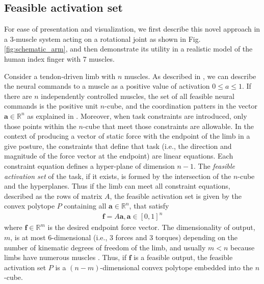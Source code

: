 \label{s:methods}
\subsection*{Feasible activation set}
For ease of presentation and visualization, we first describe this novel approach in a 3-muscle system acting on a  rotational joint as shown in Fig. \ref{fig:schematic_arm}, and then demonstrate its utility in a realistic model of the human index finger with 7 muscles. 

Consider a tendon-driven limb with $n$ muscles.
As described in \cite{Kuo1993Human, Chao1978Graphical,spoor1983balancing,Valero-Cuevas2009mathematical, valero-cuevas2015neuromechanics}, we can describe the neural commands to a muscle as a positive value of activation $0 \leq a \leq 1$.
If there are $n$ independently controlled  muscles,  the set of all feasible neural commands  is the positive unit $n$-cube, and the coordination patters in the vector $\textbf{a} \in \mathbb{R}^n$ as explained in \cite{Valero-Cuevas2009mathematical, valero-cuevas2015fundamentals}.
Moreover, when  task constraints are introduced, only those points within the $n$-cube that meet those constraints are allowable.
In the context of producing a vector of static force with the endpoint of the limb in a give posture, the constraints that define that task (i.e., the direction and magnitude of the force vector at the endpoint) are linear equations.  Each constraint equation defines a hyper-plane of dimension $n-1$.
The \emph{feasible activation set} of the task, if it exists,  is formed by the intersection of the $n$-cube and the hyperplanes.
Thus if the limb can meet all constraint equations, described as the rows of matrix $A$, the feasible activation set is given by the convex polytope $P$ containing all $\textbf{a} \in \mathbb{R}^n$, that satisfy
\begin{align}
\label{eq:constraints}
		\textbf{f} = A\textbf{a}, \textbf{a} \in [0,1]^n
\end{align}
where $\textbf{f} \in \mathbb{R}^m$ is the desired endpoint force vector.
The dimensionality of output, $m$, is  at most 6-dimensional (i.e., 3 forces and 3 torques) depending on the number of kinematic degrees of freedom of the limb, and usually $m < n$  because  limbs have numerous  muscles \cite{Valero-cuevas2015fundamentals}. Thus, if $\textbf{f}$ is a feasible  output, the feasible activation set $P$ is a $(n-m)$-dimensional convex polytope embedded into the $n$-cube.
